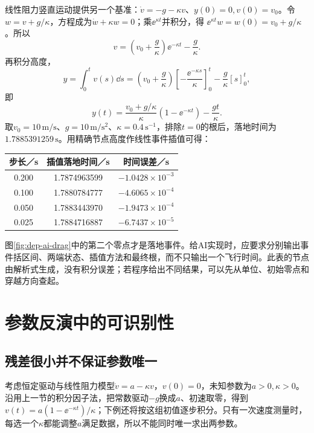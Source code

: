 线性阻力竖直运动提供另一个基准：$\dot v=-g-\kappa v$、$y(0)=0,v(0)=v_0$。令$w=v+g/\kappa$，方程成为$\dot w+\kappa w=0$；乘$\ee^{\kappa t}$并积分，得
$\ee^{\kappa t}w=w(0)=v_0+g/\kappa$。所以
\[v=\left(v_0+\frac g\kappa\right)\ee^{-\kappa t}-\frac g\kappa.\]
再积分高度，
\[y=\int_0^tv(s)\dd s
=\left(v_0+\frac g\kappa\right)
\left[-\frac{\ee^{-\kappa s}}\kappa\right]_0^t
-\frac g\kappa[s]_0^t,\]
即
\[
 y(t)=\frac{v_0+g/\kappa}{\kappa}(1-\ee^{-\kappa t})-\frac{gt}{\kappa}.
\]
取$v_0=10\,\mathrm{m/s}$、$g=10\,\mathrm{m/s^2}$、$\kappa=0.4\,\mathrm{s^{-1}}$，排除$t=0$的根后，落地时间为$1.7885391259\,\mathrm s$。用精确节点高度作线性事件插值可得：
\begin{center}\begin{tabular}{ccc}\toprule
步长／s&插值落地时间／s&时间误差／s\\\midrule
0.200&1.7874963599&$-1.0428\times10^{-3}$\\
0.100&1.7880784777&$-4.6065\times10^{-4}$\\
0.050&1.7883443970&$-1.9473\times10^{-4}$\\
0.025&1.7884716887&$-6.7437\times10^{-5}$\\\bottomrule
\end{tabular}\end{center}
图\ref{fig:dep-ai-drag}中的第二个零点才是落地事件。给AI实现时，应要求分别输出事件括区间、两端状态、插值方法和最终根，而不只输出一个飞行时间。此表的节点由解析式生成，没有积分误差；若程序给出不同结果，可以先从单位、初始零点和穿越方向查起。

\section{参数反演中的可识别性}
\subsection{残差很小并不保证参数唯一}
考虑恒定驱动与线性阻力模型$\dot v=a-\kappa v$，$v(0)=0$，未知参数为$a>0,\kappa>0$。沿用上一节的积分因子法，把常数驱动$-g$换成$a$、初速取零，得到$v(t)=a(1-\ee^{-\kappa t})/\kappa$；下例还将按这组初值逐步积分。只有一次速度测量时，每选一个$\kappa$都能调整$a$满足数据，所以不能同时唯一求出两参数。

